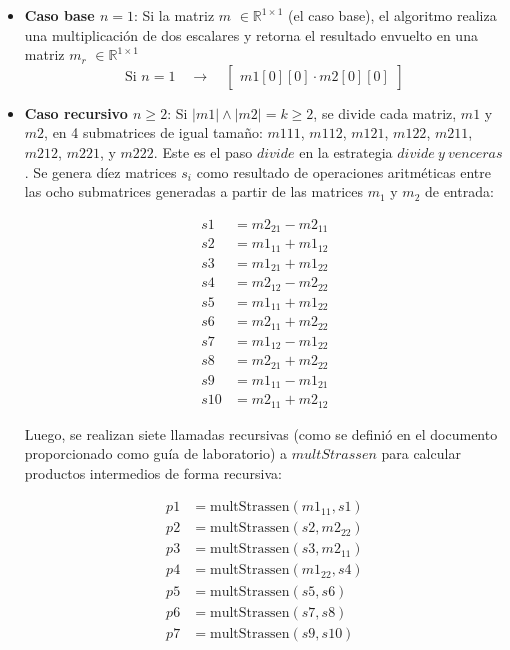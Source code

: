 \documentclass[12pt, a4paper]{article}
\begin{document}
\begin{itemize}
    \item \textbf{Caso base $n = 1$}: Si la matriz $m$ $\in \mathbb{R}^{1 \times 1}$ (el caso base), el algoritmo realiza una multiplicación de dos escalares y retorna el resultado envuelto en una matriz $m_r$ $\in \mathbb{R}^{1 \times 1}$
    \[
    \text{{Si }} n = 1 \quad \rightarrow \quad \begin{bmatrix} m1[0][0] \cdot m2[0][0] \end{bmatrix}
    \]

    \item \textbf{Caso recursivo $n \geq 2$}: Si $|m1| \land |m2| = k \geq 2$, se divide cada matriz, $m1$ y $m2$, en 4 submatrices de igual tamaño: $m{{1{11}}}$, $m{{1{12}}}$, $m{{1{21}}}$, $m{{1{22}}}$, $m{{2{11}}}$, $m{{2{12}}}$, $m{{2{21}}}$, y $m{{2{22}}}$. 
    Este es el paso $divide$ en la estrategia $divide~y~venceras$. 
    Se genera díez matrices $s_i$ como resultado de operaciones aritméticas entre las ocho submatrices 
    generadas a partir de las matrices $m_1$ y $m_2$ de entrada:
    
    
    \begin{align*}
    s1 &= m2_{21} - m2_{11} \\
    s2 &= m1_{11} + m1_{12} \\
    s3 &= m1_{21} + m1_{22} \\
    s4 &= m2_{12} - m2_{22} \\
    s5 &= m1_{11} + m1_{22} \\
    s6 &= m2_{11} + m2_{22} \\
    s7 &= m1_{12} - m1_{22} \\
    s8 &= m2_{21} + m2_{22} \\
    s9 &= m1_{11} - m1_{21} \\
    s10 &= m2_{11} + m2_{12}
    \end{align*}
    
    Luego, se realizan siete llamadas recursivas (como se definió en el documento proporcionado como guía de laboratorio) a $multStrassen$ para calcular productos intermedios de forma recursiva:
    
    \begin{align*}
    p1 &= \text{{multStrassen}}(m1_{11}, s1) \\
    p2 &= \text{{multStrassen}}(s2, m2_{22}) \\
    p3 &= \text{{multStrassen}}(s3, m2_{11}) \\
    p4 &= \text{{multStrassen}}(m1_{22}, s4) \\
    p5 &= \text{{multStrassen}}(s5, s6) \\
    p6 &= \text{{multStrassen}}(s7, s8) \\
    p7 &= \text{{multStrassen}}(s9, s10)
    \end{align*}
    

\end{itemize}
\end{document}

